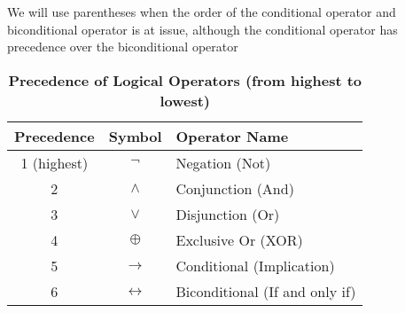 \begin{tcolorbox}[colback=white, colframe=gray!60, title=Remark 5]
We will use parentheses when the order of the conditional operator and biconditional
operator is at issue, although the conditional operator has precedence over the
biconditional operator
\end{tcolorbox}
\begin{table}[h!]
\centering
\caption*{\textbf{Precedence of Logical Operators (from highest to lowest)}}
\begin{tabular}{|c|c|l|}
\hline
\rowcolor{gray!20}
\textbf{Precedence} & \textbf{Symbol} & \textbf{Operator Name} \\
\hline
1 (highest) & $\neg$ & Negation (Not) \\
2 & $\land$ & Conjunction (And) \\
3 & $\lor$ & Disjunction (Or) \\
4 & $\oplus$ & Exclusive Or (XOR) \\
5 & $\rightarrow$ & Conditional (Implication) \\
6 & $\leftrightarrow$ & Biconditional (If and only if) \\
\hline
\end{tabular}
\end{table}













